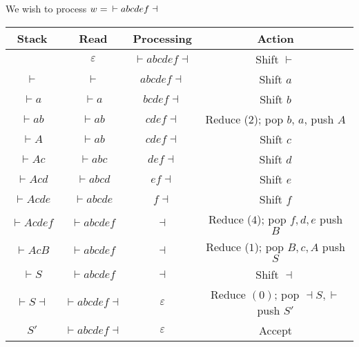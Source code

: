 \documentclass{article}
\begin{document}

We wish to process \(w = \mkern9mu \vdash a b c d e f \dashv\)


\begin{table}[H]
    \centering
    \begin{tabular}{|c|c|c|c|} \hline 
         Stack&  Read&  Processing& Action\\ \hline 
         &  $\varepsilon$&  $\vdash a b c d e f \dashv$& Shift $\vdash$\\ \hline 
         $\vdash$&  $\vdash$&  $a b c d e f \dashv$& Shift $a$\\ \hline 
         $\vdash a$&  $\vdash a$&  $b c d e f \dashv$& Shift $b$\\ \hline 
         $\vdash ab$&  $\vdash ab$&  $c d e f \dashv$& Reduce ($2$); pop $b$, $a$, push $A$\\ \hline 
         $\vdash A$&  $\vdash a b$&  $cdef \dashv$& Shift $c$\\ \hline 
         $\vdash Ac$&  $\vdash a b c$&  $def \dashv$& Shift $d$\\ \hline 
         $\vdash Acd$&  $\vdash a b c d$&  $ef \dashv$& Shift $e$\\ \hline 
         $\vdash Acde$&  $\vdash a b c d e$&  $f \dashv$& Shift $f$\\ \hline 
         $\vdash Acdef$&  $\vdash a b c d e f$&  $\dashv$& Reduce ($4$); pop $f, d, e$ push $B$\\ \hline 
         $\vdash AcB$&  $\vdash a b c de f$&  $\dashv$& Reduce ($1$); pop $B, c, A$ push $S$\\ \hline 
         $\vdash S$&  $\vdash a b c d e f$&  $\dashv$& Shift $\dashv$\\ \hline 
         $\vdash S \dashv$&  $\vdash a b c d e f \dashv$&  $\varepsilon$& Reduce $(0)$; pop $\dashv S, \vdash$ push $S'$\\ \hline 
         $S'$&  $\vdash abcdef \dashv$&  $\varepsilon$& Accept\\ \hline
    \end{tabular}
    
\end{table}
\end{document}
